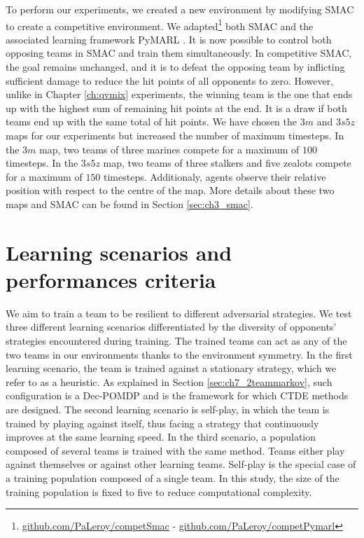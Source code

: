 To perform our experiments, we created a new environment by modifying SMAC to create a competitive environment. 
We adapted\footnote{\label{foot_note_code}\url{github.com/PaLeroy/competSmac} - \url{github.com/PaLeroy/competPymarl}} both SMAC and the associated learning framework PyMARL \citep{samvelyan2019starcraft}.
It is now possible to control both opposing teams in SMAC and train them simultaneously.
In competitive SMAC, the goal remains unchanged, and it is to defeat the opposing team by inflicting sufficient damage to reduce the hit points of all opponents to zero.
However, unlike in Chapter \ref{ch:qvmix} experiments, the winning team is the one that ends up with the highest sum of remaining hit points at the end.
It is a draw if both teams end up with the same total of hit points.
We have chosen the $3m$ and $3s5z$ maps for our experiments but increased the number of maximum timesteps.
In the $3m$ map, two teams of three marines compete for a maximum of $100$ timesteps.
In the $3s5z$ map, two teams of three stalkers and five zealots compete for a maximum of $150$ timesteps.
Additionaly, agents observe their relative position with respect to the centre of the map.
More details about these two maps and SMAC can be found in Section \ref{sec:ch3_smac}.

\section{Learning scenarios and performances criteria} \label{sec:ch7_learningscenar}
We aim to train a team to be resilient to different adversarial strategies.
We test three different learning scenarios differentiated by the diversity of opponents' strategies encountered during training.
The trained teams can act as any of the two teams in our environments thanks to the environment symmetry.
In the first learning scenario, the team is trained against a stationary strategy, which we refer to as a heuristic.
As explained in Section \ref{sec:ch7_2teammarkov}, such configuration is a Dec-POMDP and is the framework for which CTDE methods are designed.
The second learning scenario is self-play, in which the team is trained by playing against itself, thus facing a strategy that continuously improves at the same learning speed.
In the third scenario, a population composed of several teams is trained with the same method.
Teams either play against themselves or against other learning teams.
Self-play is the special case of a training population composed of a single team.
In this study, the size of the training population is fixed to five to reduce computational complexity.

